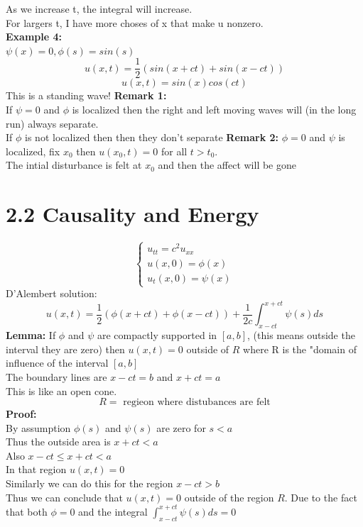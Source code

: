 \documentclass{article}
\begin{document}
As we increase t, the integral will increase.\\
For largers t, I have more choses of x that make u nonzero.\\
\textbf{Example 4: }\\
$\psi(x) = 0, \phi(s) = sin(s)$
$$ u(x,t) = \frac{1}{2} \left( sin(x + ct) + sin(x - ct) \right)$$
$$ u(x,t) = sin(x) cos(ct)$$
This is a standing wave! 
\textbf{Remark 1:}\\
If $\psi = 0$ and $\phi$ is localized then the right and left moving waves will (in the long run) always separate.\\
If $\phi$ is not localized then then they don't separate
\textbf{Remark 2:} $\phi = 0 $ and $\psi$ is localized, fix $x_0$ then $u(x_0,t) = 0 $ for all $t >t_0$.\\
The intial disturbance is felt at $x_0$ and then the affect will be gone
\section*{2.2 Causality and Energy }
$$\begin{cases}
    u_{tt} = c^2 u_{xx} \\
    u(x,0) = \phi(x)\\
    u_t(x,0) = \psi(x)
\end{cases}
$$
D'Alembert solution:
$$ u(x,t) = \frac{1}{2} \left( \phi(x + ct) + \phi(x - ct) \right) + \frac{1}{2c} \int_{x - ct}^{x + ct} \psi(s) ds $$
\textbf{Lemma: }
If $\phi$ and $\psi$ are compactly supported in $[a,b]$, (this means outside the interval they are zero) then $u(x,t) = 0$ outside of $R$ where R is the "domain of influence of the interval $[a,b]$\\
The boundary lines are $x - ct =b$ and $x + ct = a$\\
This is like an open cone.\\
$$ R = \text{ regieon where distubances are felt}$$
\textbf{Proof:}\\
By assumption $\phi(s)$ and $\psi(s)$ are zero for $s < a $\\
Thus the outside area is $x + ct < a$\\
Also $x - ct \leq x+ct < a$\\
In that region $u(x,t) = 0$\\
Similarly we can do this for the region $x - ct > b$\\
Thus we can conclude that $u(x,t) = 0$ outside of the region $R$. Due to the fact that both $\phi =0$ and the integral $\int_{x-ct}^{x+ct} \psi(s) ds = 0$ \\
\end{document}
